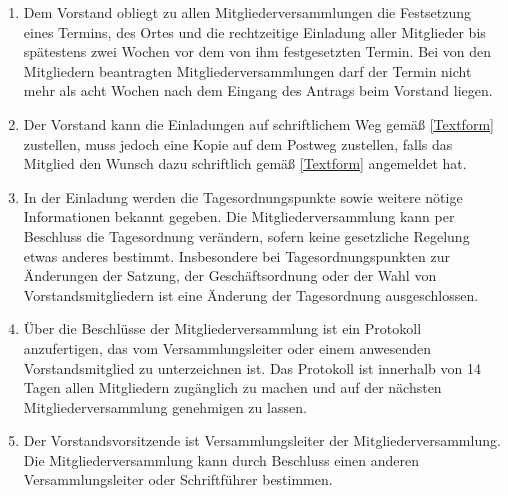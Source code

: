 \documentclass[fontsize=12pt,paper=a4,pagesize,headings=small]{scrartcl}
\begin{document}
\begin{enumerate}
    \item Dem Vorstand obliegt zu allen Mitgliederversammlungen die
    Festsetzung eines Termins, des Ortes und die rechtzeitige Einladung
    aller Mitglieder bis spätestens zwei Wochen vor dem von ihm
    festgesetzten Termin. Bei von den Mitgliedern beantragten
    Mitgliederversammlungen darf der Termin nicht mehr als acht Wochen
    nach dem Eingang des Antrags beim Vorstand liegen.

    \item Der Vorstand kann die Einladungen auf schriftlichem Weg gemäß
    \ref{Textform} zustellen, muss jedoch eine Kopie auf dem
    Postweg zustellen, falls das Mitglied den Wunsch dazu schriftlich
    gemäß \ref{Textform} angemeldet hat.

    \item In der Einladung werden die Tagesordnungspunkte sowie weitere
    nötige Informationen bekannt gegeben. Die Mitgliederversammlung
    kann per Beschluss die Tagesordnung verändern, sofern keine
    gesetzliche Regelung etwas anderes bestimmt. Insbesondere bei
    Tagesordnungspunkten zur Änderungen der Satzung, der
    Geschäftsordnung oder der Wahl von Vorstandsmitgliedern ist eine
    Änderung der Tagesordnung ausgeschlossen.

    \item Über die Beschlüsse der Mitgliederversammlung ist ein
    Protokoll anzufertigen, das vom Versammlungsleiter oder einem
    anwesenden Vorstandsmitglied zu unterzeichnen ist. Das Protokoll
    ist innerhalb von 14 Tagen allen Mitgliedern zugänglich zu machen
    und auf der nächsten Mitgliederversammlung genehmigen zu lassen.

    \item Der Vorstandsvorsitzende ist Versammlungsleiter der
    Mitgliederversammlung. Die Mitgliederversammlung kann durch
    Beschluss einen anderen Versammlungsleiter oder Schriftführer
    bestimmen.
\end{enumerate}
\end{document}
